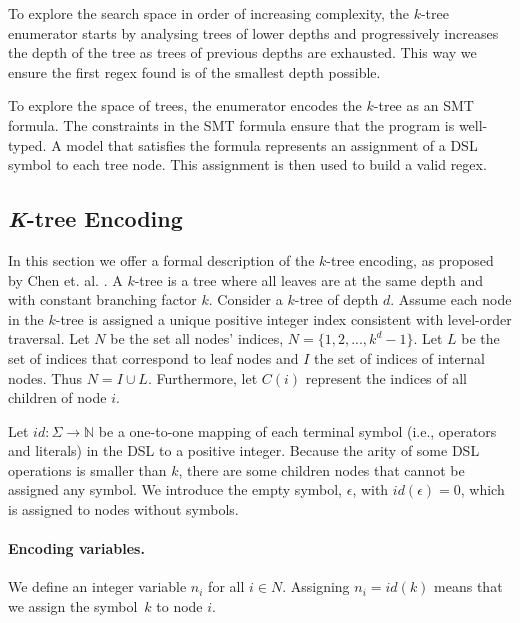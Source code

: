 To explore the search space in order of increasing complexity, the \(k\)-tree enumerator starts by analysing trees of lower depths and progressively increases the depth of the tree as trees of previous depths are exhausted.
This way we ensure the first regex found is of the smallest depth possible.





To explore the space of trees, the enumerator encodes the \(k\)-tree as an \ac{SMT} formula. 
%
The constraints in the \ac{SMT} formula ensure that the program is well-typed. 
%
A model that satisfies the formula represents an assignment of a DSL symbol to each tree node. This assignment is then used to build a valid regex.

\subsection{\textit{K}-tree Encoding}\label{sec:k-tree}

In this section we offer a formal description of the \(k\)-tree encoding, as proposed by Chen et. al. \cite{DBLP:conf/sigsoft/ChenMF19,Orvalho19}.
A \(k\)-tree is a tree where all leaves are at the same depth and with constant branching factor \(k\).
Consider a \(k\)-tree of depth \(d\). Assume each node in the \(k\)-tree is assigned a unique positive integer index consistent with level-order traversal. Let \(N\) be the set all nodes' indices, \(N = \{1, 2, ..., k^d - 1\}\).
%
Let \(L\) be the set of indices that correspond to leaf nodes and \(I\) the set of indices of internal nodes. Thus \(N = I \cup L\). Furthermore, let \(C(i)\) represent the indices of all children of node \(i\).

Let \(id: \Sigma \to \mathbb{N}\) be a one-to-one mapping of each terminal symbol (i.e., operators and literals) in the DSL to a positive integer.
Because the arity of some DSL operations is smaller than \(k\), there are some children nodes that cannot be assigned any symbol. We introduce the empty symbol, \(\epsilon\), with \(id(\epsilon) = 0\), which is assigned to nodes without symbols.

\paragraph{Encoding variables.}
We define an integer variable \(n_i\) for all \(i \in N\). Assigning \(n_i = id(k)\) means
that we assign the symbol~\(k\) to node \(i\).

\medskip

